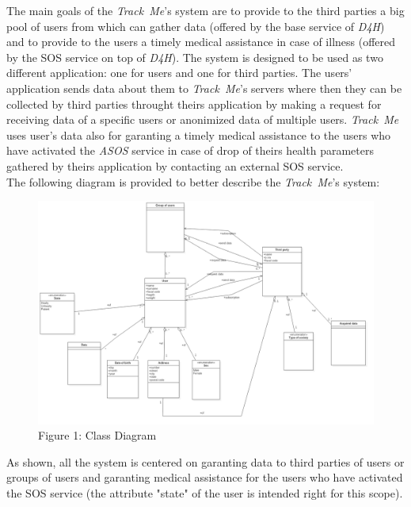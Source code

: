 The main goals of the \hbox{\emph{Track Me}}'s system are to provide to the third parties a big pool of users from which can gather data (offered by the base service of \hbox{\emph{D4H}}) and to provide to the users a timely medical  assistance in case of illness (offered by the SOS service on top of \hbox{\emph{D4H}}). The system is designed to be used as two different application: one for users and one for third parties. The users' application sends data about them to \hbox{\emph{Track Me}}'s servers where then they can be collected by third parties throught theirs application by making a request for receiving data of a specific users or anonimized data of multiple users. \hbox{\emph{Track Me}} uses user's data also for garanting a timely medical assistance to the users who have activated the \hbox{\emph{ASOS}} service in case of drop of theirs health parameters gathered by theirs application by contacting an external SOS service.\\

The following diagram is provided to better describe the \hbox{\emph{Track Me}}'s system:
\begin{figure}
	\includegraphics[width=1.00\textwidth]{./pictures/uml_v1.png}\par
	\caption{Figure 1: Class Diagram}
\end{figure}
\FloatBarrier
\vspace{0.3cm}As shown, all the system is centered on garanting data to third parties of users or groups of users and garanting medical assistance for the users who have activated the SOS service (the attribute "state" of the user is intended right for this scope).


